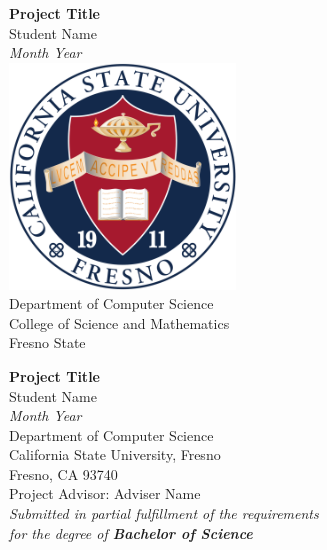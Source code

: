 \documentclass[12pt,onecolumn]{article}
\begin{document}
\begin{titlepage}
   \begin{center}
      \LARGE\textbf{Project Title}\\
      \large{Student Name} \\
			\large\textit{Month Year} \\
			\includegraphics[width=6cm]{csufresno.png} \\
			\large{Department of Computer Science}\\
			\large{College of Science and Mathematics}\\
			\large{Fresno State}\\
   \end{center}
\end{titlepage}

\newpage
{} 

\begin{center}
\LARGE\textbf{Project Title}\\
\large{Student Name}\\
\large\textit{Month Year}\\
\large{Department of Computer Science}\\
\large{California State University, Fresno}\\
\large{Fresno, CA 93740}\\
\large{Project Advisor: Adviser Name}\\
\large\textit{Submitted in partial fulfillment of the requirements\\ for the degree of \textbf{Bachelor of Science}}
\end{center}
\end{document}
